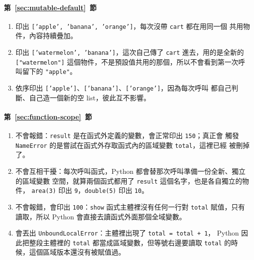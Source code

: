 \paragraph{第~\ref{sec:mutable-default}~節}
\begin{enumerate}
\item 印出 \texttt{['apple', 'banana', 'orange']}，每次沒帶 \texttt{cart} 都在用同一個
共用物件，內容持續疊加。
\item 印出 \texttt{['watermelon', 'banana']}，這次自己傳了 \texttt{cart} 進去，用的是全新的
\texttt{["watermelon"]} 這個物件，不是預設值共用的那個，所以不會看到第一次呼叫留下的
\texttt{"apple"}。
\item 依序印出 \texttt{['apple']}、\texttt{['banana']}、\texttt{['orange']}，因為每次呼叫
都自己判斷、自己造一個新的空 list，彼此互不影響。
\end{enumerate}

\paragraph{第~\ref{sec:function-scope}~節}
\begin{enumerate}
\item 不會報錯：\texttt{result} 是在函式外定義的變數，會正常印出 \texttt{150}；真正會
觸發 \texttt{NameError} 的是嘗試在函式外存取函式內的區域變數 \texttt{total}，這裡已經
被刪掉了。
\item 不會互相干擾：每次呼叫函式，Python 都會替那次呼叫準備一份全新、獨立的區域變數
空間，就算兩個函式都用了 \texttt{result} 這個名字，也是各自獨立的物件，
\texttt{area(3)} 印出 \texttt{9}，\texttt{double(5)} 印出 \texttt{10}。
\item 不會報錯，會印出 \texttt{100}：\texttt{show} 函式主體裡沒有任何一行對
\texttt{total} 賦值，只有讀取，所以 Python 會直接去讀函式外面那個全域變數。
\item 會丟出 \texttt{UnboundLocalError}：主體裡出現了 \texttt{total = total + 1}，
Python 因此把整段主體裡的 \texttt{total} 都當成區域變數，但等號右邊要讀取
\texttt{total} 的時候，這個區域版本還沒有被賦值過。
\end{enumerate}

